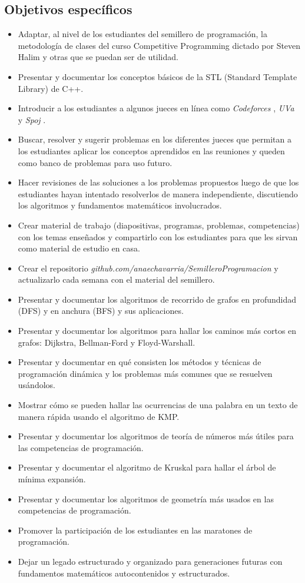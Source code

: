 \documentclass[11pt, oneside]{article}
\theoremstyle{definition}
\theoremstyle{remark}
\begin{document}
\subsection{Objetivos específicos}
\begin{itemize}
	\item{Adaptar, al nivel de los estudiantes del semillero de programación, la metodología de clases del curso Competitive Programming dictado por Steven Halim \cite{CourseNUS} y otras que se puedan ser de utilidad.}
	\item{Presentar y documentar los conceptos básicos de la STL (Standard Template Library) de C++.}
	\item{Introducir a los estudiantes a algunos jueces en línea como \emph{Codeforces} \cite{Codeforces}, \emph{UVa} \cite{UVa} y \emph{Spoj} \cite{Spoj}.}
	\item{Buscar, resolver y sugerir problemas en los diferentes jueces que permitan a los estudiantes aplicar los conceptos aprendidos en las reuniones y queden como banco de problemas para uso futuro.}
	\item{Hacer revisiones de las soluciones a los problemas propuestos luego de que los estudiantes hayan intentado resolverlos de manera independiente, discutiendo los algoritmos y fundamentos matemáticos involucrados.}
	\item{Crear material de trabajo (diapositivas, programas, problemas, competencias) con los temas enseñados y compartirlo con los estudiantes para que les sirvan como material de estudio en casa.}
	\item{Crear el repositorio \emph{github.com/anaechavarria/SemilleroProgramacion} y actualizarlo cada semana con el material del semillero.}
	\item{Presentar y documentar los algoritmos de recorrido de grafos en profundidad (DFS) y en anchura (BFS) y sus aplicaciones.}
	\item{Presentar y documentar los algoritmos para hallar los caminos más cortos en grafos: Dijkstra, Bellman-Ford y Floyd-Warshall.}
	\item{Presentar y documentar en qué consisten los métodos y técnicas de programación dinámica y los problemas más comunes que se resuelven usándolos.}
	\item{Mostrar cómo se pueden hallar las ocurrencias de una palabra en un texto de manera rápida usando el algoritmo de KMP.}
	\item{Presentar y documentar los algoritmos de teoría de números más útiles \cite{ProgrammingChallenges, Halim, Halim2, Brasil} para las competencias de programación.}
	\item{Presentar y documentar el algoritmo de Kruskal para hallar el árbol de mínima expansión.}
	\item{Presentar y documentar los algoritmos de geometría más usados \cite{ProgrammingChallenges, Halim, Halim2, Brasil} en las competencias de programación.}
	\item{Promover la participación de los estudiantes en las maratones de programación.}
	\item{Dejar un legado estructurado y organizado para generaciones futuras con fundamentos matemáticos autocontenidos y estructurados.}
\end{itemize}
\end{document}
